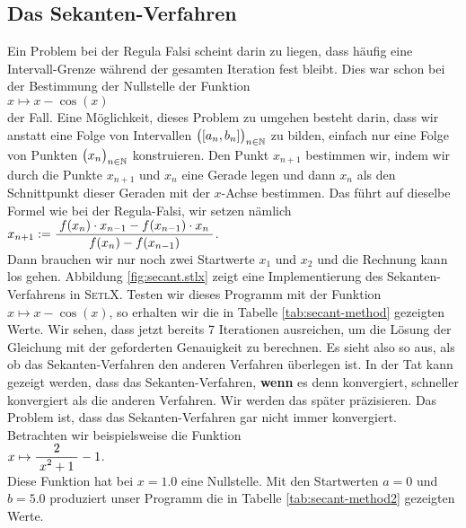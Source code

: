 \subsection{Das Sekanten-Verfahren}
Ein Problem bei der Regula Falsi scheint darin zu liegen, dass h\"aufig eine
Intervall-Grenze w\"ahrend der gesamten Iteration fest bleibt.  Dies war schon bei der
Bestimmung der Nullstelle der Funktion
\\[0.2cm]
\hspace*{1.3cm}
$x \mapsto x - \cos(x)$ 
\\[0.2cm]
der Fall.  Eine
M\"oglichkeit, dieses Problem zu umgehen besteht darin, dass wir anstatt eine Folge von
Intervallen $\bigl([a_n, b_n]\bigr)_{n\in\mathbb{N}}$ zu bilden, einfach nur eine Folge von Punkten
$\bigl(x_n\bigr)_{n\in\mathbb{N}}$ konstruieren.  Den Punkt $x_{n+1}$ bestimmen wir, indem wir durch die Punkte
$x_{n+1}$ und $x_n$ eine Gerade legen und dann $x_n$ als den Schnittpunkt dieser Geraden
mit der $x$-Achse bestimmen.  Das f\"uhrt auf dieselbe Formel wie bei der Regula-Falsi, wir
setzen n\"amlich
\\[0.2cm]
\hspace*{1.3cm}
$x_{n+1} := \displaystyle\frac{\;\displaystyle f(x_{n}) \cdot x_{n-1} - f(x_{n-1}) \cdot x_n\;}{\;\displaystyle f(x_{n}) - f(x_{n-1})\;}$.
\\[0.2cm]
Dann brauchen wir nur noch zwei Startwerte $x_1$ und $x_2$ und die Rechnung kann los gehen.
Abbildung \ref{fig:secant.stlx} zeigt eine Implementierung des Sekanten-Verfahrens in
\textsc{SetlX}.  Testen wir dieses Programm mit der Funktion $x \mapsto x - \cos(x)$, so
erhalten wir die in Tabelle \ref{tab:secant-method} gezeigten Werte.
Wir sehen, dass jetzt bereits 7 Iterationen ausreichen, um die L\"osung der Gleichung mit
der geforderten Genauigkeit zu berechnen.  Es sieht also so aus, als ob das
Sekanten-Verfahren den anderen Verfahren \"uberlegen ist.  In der Tat kann gezeigt werden, dass
das Sekanten-Verfahren, \textbf{wenn} es denn konvergiert, schneller konvergiert als die anderen
Verfahren. Wir werden das sp\"ater pr\"azisieren.  Das Problem ist, dass das Sekanten-Verfahren
gar nicht immer konvergiert.  Betrachten wir beispielsweise die Funktion 
\\[0.2cm]
\hspace*{1.3cm}
$x \mapsto \displaystyle\frac{\;\displaystyle2\;}{\;\displaystyle x^2 + 1\;} - 1$. 
\\[0.2cm]
Diese Funktion hat bei $x = 1.0$ eine Nullstelle.  Mit
den Startwerten $a = 0$ und $b = 5.0$ produziert unser Programm die in Tabelle
\ref{tab:secant-method2}
gezeigten Werte.


